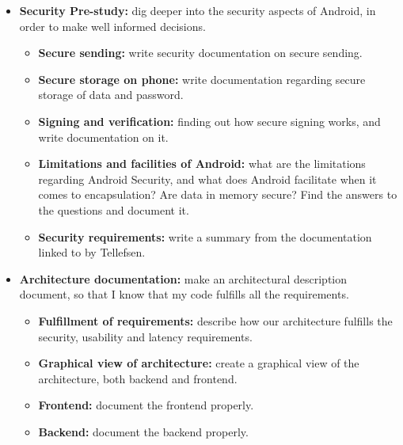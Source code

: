 \begin{itemize}
\begin{itemize}
\end{itemize}
\item{}\textbf{Security Pre-study:} dig deeper into the security aspects of Android, in order to make well informed decisions.
\begin{itemize}
\item{}\textbf{Secure sending:} write security documentation on secure sending.
\item{}\textbf{Secure storage on phone:} write documentation regarding secure storage of data and password.
\item{}\textbf{Signing and verification:} finding out how secure signing works, and write documentation on it.
\item{}\textbf{Limitations and facilities of Android:} what are the limitations regarding Android Security, and what does Android facilitate when it comes to encapsulation? Are data in memory secure? Find the answers to the questions and document it.
\item{}\textbf{Security requirements:} write a summary from the documentation linked to by Tellefsen.
\end{itemize}
\item{}\textbf{Architecture documentation:} make an architectural description document, so that I know that my code fulfills all the requirements.
\begin{itemize}
\item{}\textbf{Fulfillment of requirements:} describe how our architecture fulfills the security, usability and latency requirements.
\item{}\textbf{Graphical view of architecture:} create a graphical view of the architecture, both backend and frontend.
\item{}\textbf{Frontend:} document the frontend properly.
\item{}\textbf{Backend:} document the backend properly.
\end{itemize}
\end{itemize}
